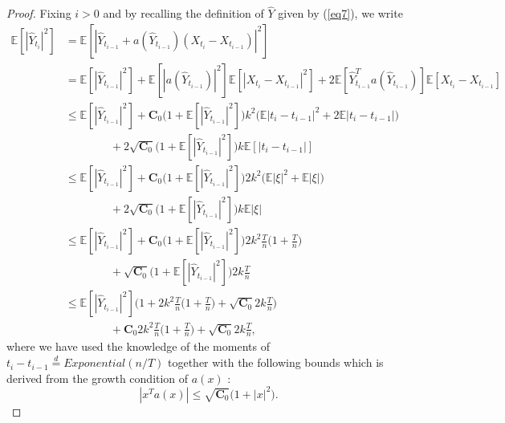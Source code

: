 \begin{proof}
Fixing $i >  0$ and by recalling the definition of  $\hat{Y}$ given by (\ref{eq7}),  we write
\begin{align}\label{eq16}
        \mathbb{E}[|\hat{Y}_{t_i}|^2] &= \mathbb{E}[|\hat{Y}_{t_{i-1}} + a(\hat{Y}_{t_{i-1}})(X_{t_i} - X_{t_{i-1}})|^2] \nonumber \\
        &= \mathbb{E}[|\hat{Y}_{t_{i-1}}|^2] + \mathbb{E}[|a(\hat{Y}_{t_{i-1}})|^2]\mathbb{E}[|X_{t_i} - X_{t_{i-1}}|^2] + 2\mathbb{E}[\hat{Y}_{t_{i-1}}^T a(\hat{Y}_{t_{i-1}})]\mathbb{E}[X_{t_i} - X_{t_{i-1}}] \nonumber \\
        &\leq \mathbb{E}[|\hat{Y}_{t_{i-1}}|^2] + \mathbf{C}_0 \big(1 + \mathbb{E}[|\hat{Y}_{t_{i-1}}|^2] \big) k^2 \big( \mathbb{E} |t_{i} - t_{i-1}|^2 + 2 \mathbb{E} |t_{i} - t_{i-1}| \big) \nonumber \\
        &\qquad\qquad+  2 \sqrt{\mathbf{C}_0}  \big(1 + \mathbb{E}[|\hat{Y}_{t_{i-1}}|^2] \big) k \mathbb{E} [|t_{i} - t_{i-1}|]\nonumber \\
        &\leq \mathbb{E}[|\hat{Y}_{t_{i-1}}|^2] + \mathbf{C}_0  \big(1 + \mathbb{E}[|\hat{Y}_{t_{i-1}}|^2] \big) 2 k^2 \big( \mathbb{E} |\xi|^2 + \mathbb{E} |\xi| \big) \nonumber \\
        &\qquad\qquad+  2\sqrt{\mathbf{C}_0} \big( 1 + \mathbb{E}[|\hat{Y}_{t_{i-1}}|^2] \big) k \mathbb{E}|\xi|\nonumber \\
        &\leq \mathbb{E}[|\hat{Y}_{t_{i-1}}|^2] + \mathbf{C}_0 \big(1 +  \mathbb{E}[|\hat{Y}_{t_{i-1}}|^2] \big) 2k^2 \frac{T}{n} \bigg(1 + \frac{T}{n} \bigg) \\
        &\qquad\qquad+ \sqrt{\mathbf{C}_0} \big( 1 + \mathbb{E}[|\hat{Y}_{t_{i-1}}|^2] \big) 2k \frac{T}{n}\nonumber \\
        &\leq \mathbb{E}[|\hat{Y}_{t_{i-1}}|^2]\bigg( 1 + 2k^2 \frac{T}{n} \bigg(1 + \frac{T}{n} \bigg) +  \sqrt{\mathbf{C}_0}  2k \frac{T}{n} \bigg) \nonumber \\
        &\qquad\qquad+ \mathbf{C}_0 2k^2 \frac{T}{n}  \bigg(1 + \frac{T}{n} \bigg) + \sqrt{\mathbf{C}_0}  2k \frac{T}{n}, \nonumber
\end{align}
where we have used the knowledge of the moments of $t_{i} - t_{i-1} \overset{d}{=} Exponential(n/T)$ together with the following bounds which is derived from the growth condition of $a(x)$ : 
\begin{equation*}
    |x^T a(x)| \leq \sqrt{\mathbf{C}_0}\big(1 + |x|^2 \big).

\end{equation*}
\end{proof}
